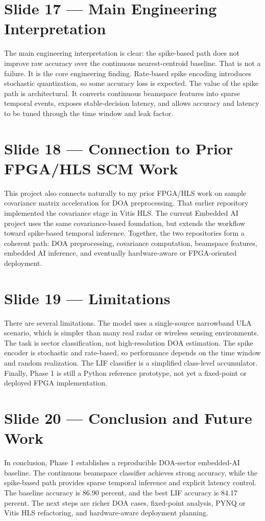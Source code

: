 \documentclass[11pt]{article}
\begin{document}
\section*{Slide 17 — Main Engineering Interpretation}
The main engineering interpretation is clear: the spike-based path does not improve raw accuracy over the continuous nearest-centroid baseline. That is not a failure. It is the core engineering finding. Rate-based spike encoding introduces stochastic quantization, so some accuracy loss is expected. The value of the spike path is architectural. It converts continuous beamspace features into sparse temporal events, exposes stable-decision latency, and allows accuracy and latency to be tuned through the time window and leak factor.

\section*{Slide 18 — Connection to Prior FPGA/HLS SCM Work}
This project also connects naturally to my prior FPGA/HLS work on sample covariance matrix acceleration for DOA preprocessing. That earlier repository implemented the covariance stage in Vitis HLS. The current Embedded AI project uses the same covariance-based foundation, but extends the workflow toward spike-based temporal inference. Together, the two repositories form a coherent path: DOA preprocessing, covariance computation, beamspace features, embedded AI inference, and eventually hardware-aware or FPGA-oriented deployment.

\section*{Slide 19 — Limitations}
There are several limitations. The model uses a single-source narrowband ULA scenario, which is simpler than many real radar or wireless sensing environments. The task is sector classification, not high-resolution DOA estimation. The spike encoder is stochastic and rate-based, so performance depends on the time window and random realization. The LIF classifier is a simplified class-level accumulator. Finally, Phase 1 is still a Python reference prototype, not yet a fixed-point or deployed FPGA implementation.

\section*{Slide 20 — Conclusion and Future Work}
In conclusion, Phase 1 establishes a reproducible DOA-sector embedded-AI baseline. The continuous beamspace classifier achieves strong accuracy, while the spike-based path provides sparse temporal inference and explicit latency control. The baseline accuracy is 86.90 percent, and the best LIF accuracy is 84.17 percent. The next steps are richer DOA cases, fixed-point analysis, PYNQ or Vitis HLS refactoring, and hardware-aware deployment planning.
\end{document}
